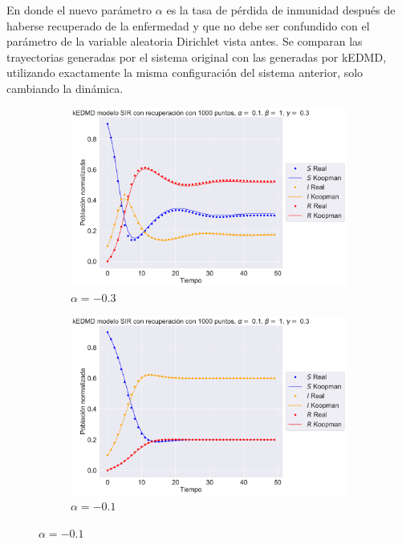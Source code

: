 En donde el nuevo parámetro $\alpha$ es la tasa de pérdida de inmunidad después de haberse recuperado de la enfermedad y que no debe ser confundido con el parámetro de la variable aleatoria Dirichlet vista antes.
Se comparan las trayectorias generadas por el sistema original con las generadas por kEDMD, utilizando exactamente la misma configuración del sistema anterior, solo cambiando la dinámica.
\begin{figure}[h]
    \centering
    \begin{subfigure}[b]{0.45\textwidth}
        \centering
        \includegraphics[width=\textwidth]{img/content/chapter3/SIR_rec1.pdf}
        \caption{$\alpha=-0.3$}
        \label{fig:image1}
    \end{subfigure}
    \hfill
    \begin{subfigure}[b]{0.45\textwidth}
        \centering
        \includegraphics[width=\textwidth]{img/content/chapter3/SIR_rec2.pdf}
        \caption{$\alpha=-0.1$}

\end{subfigure}
\end{figure}
